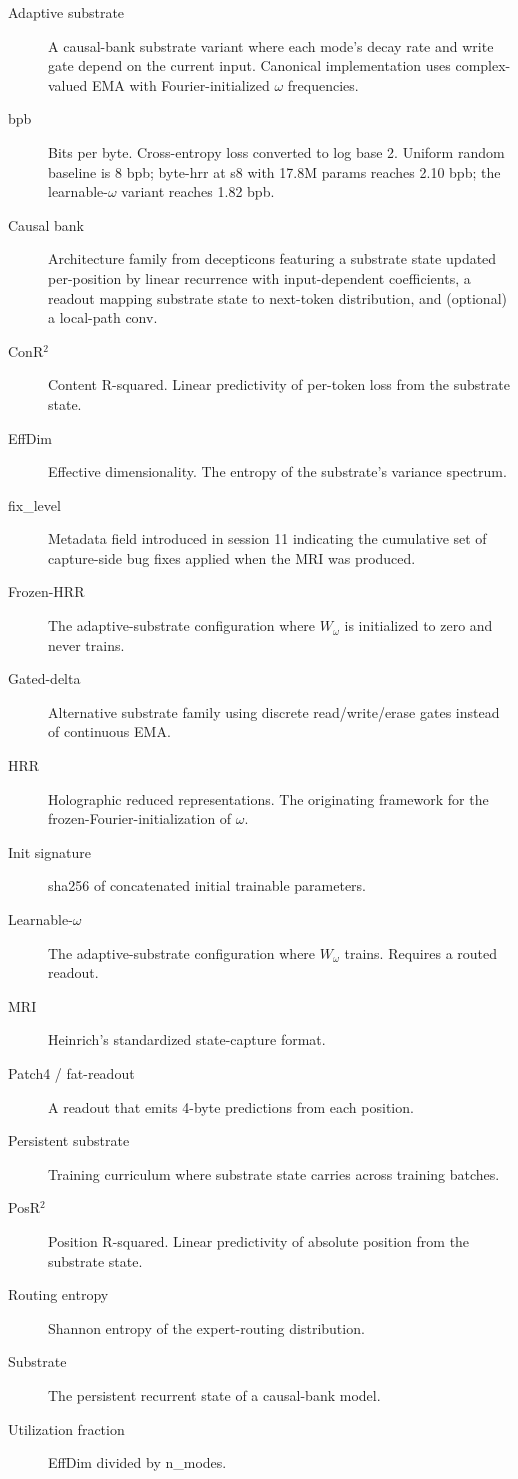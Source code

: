 \documentclass[11pt,openany]{book}
\begin{document}
\begin{description}
  \item[Adaptive substrate] A causal-bank substrate variant where
  each mode's decay rate and write gate depend on the current input.
  Canonical implementation uses complex-valued EMA with
  Fourier-initialized $\omega$ frequencies.
  \item[bpb] Bits per byte. Cross-entropy loss converted to log base 2.
  Uniform random baseline is 8 bpb; byte-hrr at s8 with 17.8M params
  reaches 2.10 bpb; the learnable-$\omega$ variant reaches 1.82 bpb.
  \item[Causal bank] Architecture family from decepticons featuring a
  substrate state updated per-position by linear recurrence with
  input-dependent coefficients, a readout mapping substrate state to
  next-token distribution, and (optional) a local-path conv.
  \item[ConR$^2$] Content R-squared. Linear predictivity of per-token
  loss from the substrate state.
  \item[EffDim] Effective dimensionality. The entropy of the
  substrate's variance spectrum.
  \item[fix\_level] Metadata field introduced in session 11
  indicating the cumulative set of capture-side bug fixes applied
  when the MRI was produced.
  \item[Frozen-HRR] The adaptive-substrate configuration where
  $W_\omega$ is initialized to zero and never trains.
  \item[Gated-delta] Alternative substrate family using discrete
  read/write/erase gates instead of continuous EMA.
  \item[HRR] Holographic reduced representations. The originating
  framework for the frozen-Fourier-initialization of $\omega$.
  \item[Init signature] sha256 of concatenated initial trainable
  parameters.
  \item[Learnable-$\omega$] The adaptive-substrate configuration where
  $W_\omega$ trains. Requires a routed readout.
  \item[MRI] Heinrich's standardized state-capture format.
  \item[Patch4 / fat-readout] A readout that emits 4-byte predictions
  from each position.
  \item[Persistent substrate] Training curriculum where substrate
  state carries across training batches.
  \item[PosR$^2$] Position R-squared. Linear predictivity of absolute
  position from the substrate state.
  \item[Routing entropy] Shannon entropy of the expert-routing
  distribution.
  \item[Substrate] The persistent recurrent state of a causal-bank
  model.
  \item[Utilization fraction] EffDim divided by n\_modes.
\end{description}
\end{document}
